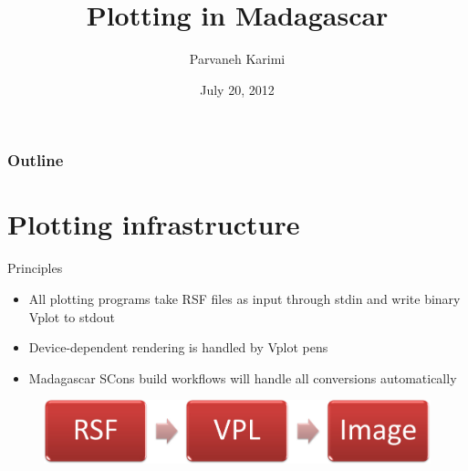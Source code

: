 \newcommand{\sconscode}[3]
{
  \begin{block}{}
  
  \end{block}
}

%
%
\title[]{Plotting in Madagascar}

\author[Karimi]{Parvaneh Karimi}
\date[Madagascar school in Austin] %
{July 20, 2012}

\begin{frame}
  \titlepage
  \appendix
\end{frame}

\begin{frame}
  \frametitle{Outline}
   \hspace*{2cm}
   \begin{minipage}[t][3cm]{10cm}
    \tableofcontents
   \end{minipage}
\end{frame}

\section{Plotting infrastructure}

\begin{frame}
  \begin{block}{Principles}
    \begin{itemize}
      \item All plotting programs take RSF files as input through stdin and write binary Vplot to stdout
      \item Device-dependent rendering is handled by Vplot pens
      \item Madagascar SCons build workflows will handle all conversions automatically
    \end{itemize}
  \end{block}
  \begin{figure}
  \includegraphics[scale=0.45]{plot/Fig/RFS.pdf}
  \end{figure}
\end{frame}

